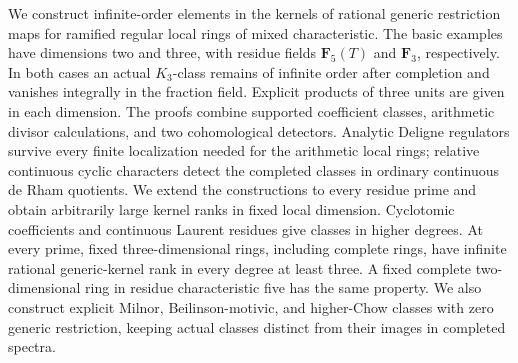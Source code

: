 We construct infinite-order elements in the kernels of rational generic
restriction maps for ramified regular local rings of mixed
characteristic. The basic examples have dimensions two and three,
with residue fields $\mathbf F_5(T)$ and $\mathbf F_3$, respectively.
In both cases an actual $K_3$-class remains of infinite order after
completion and vanishes integrally in the fraction field. Explicit
products of three units are given in each dimension. The proofs combine
supported coefficient classes, arithmetic divisor calculations, and
two cohomological detectors. Analytic Deligne regulators survive every
finite localization needed for the arithmetic local rings; relative
continuous cyclic characters detect the completed classes in ordinary
continuous de Rham quotients. We extend the constructions to every
residue prime and obtain arbitrarily large kernel ranks in fixed local
dimension. Cyclotomic coefficients and continuous Laurent residues give
classes in higher degrees. At every prime, fixed three-dimensional
rings, including complete rings, have infinite rational generic-kernel
rank in every degree at least three. A fixed complete two-dimensional
ring in residue characteristic five has the same property. We also
construct explicit Milnor, Beilinson-motivic, and higher-Chow classes
with zero generic restriction, keeping actual classes distinct from
their images in completed spectra.
